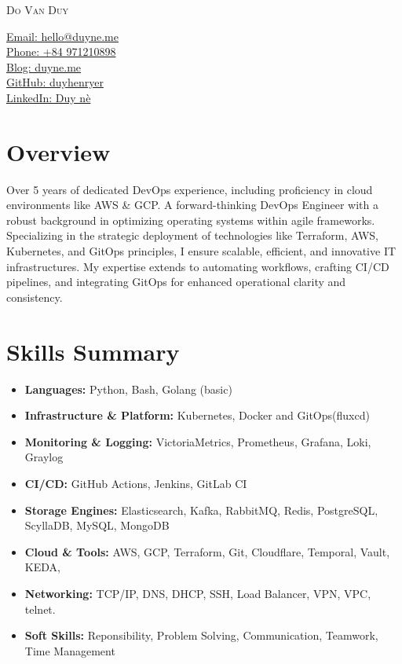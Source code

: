 \documentclass[11pt, a4paper]{article}
\begin{document}
\noindent
\begin{minipage}[t]{0.60\textwidth}
    \Huge\scshape Do Van Duy
\end{minipage}%
\begin{minipage}[t]{0.40\textwidth}
    \raggedleft
    \normalsize
    \href{mailto:hello@duyne.me}{Email: hello@duyne.me}\\
    \href{tel:+84971210898}{Phone: +84 971210898}\\
    \href{https://duyne.me}{Blog: duyne.me}\\
    \href{https://github.com/duyhenryerz}{GitHub: duyhenryer}\\
    \href{https://linkedin.com/in/duyne}{LinkedIn: Duy nè}
\end{minipage}
\vspace{0.75em}


\section{Overview}
\begingroup
{}
Over 5 years of dedicated DevOps experience, including proficiency in cloud environments like AWS \& GCP. A forward-thinking DevOps Engineer with a robust background in optimizing operating systems within agile frameworks. Specializing in the strategic deployment of technologies like Terraform, AWS, Kubernetes, and GitOps principles, I ensure scalable, efficient, and innovative IT infrastructures. My expertise extends to automating workflows, crafting CI/CD pipelines, and integrating GitOps for enhanced operational clarity and consistency.
\endgroup

\section{Skills Summary}
\begin{itemize}[leftmargin=*, label={}]
    \item \textbf{Languages:} Python, Bash, Golang (basic)
    \item \textbf{Infrastructure \& Platform:} Kubernetes, Docker and GitOps(fluxcd)
    \item \textbf{Monitoring \& Logging:} VictoriaMetrics, Prometheus, Grafana, Loki, Graylog
    \item \textbf{CI/CD:} GitHub Actions, Jenkins, GitLab CI
    \item \textbf{Storage Engines:} Elasticsearch, Kafka, RabbitMQ, Redis, PostgreSQL, ScyllaDB, MySQL, MongoDB
    \item \textbf{Cloud \& Tools:} AWS, GCP, Terraform, Git, Cloudflare, Temporal, Vault, KEDA,
    \item \textbf{Networking:} TCP/IP, DNS, DHCP, SSH, Load Balancer, VPN, VPC, telnet.
    \item \textbf{Soft Skills:} Reponsibility, Problem Solving, Communication, Teamwork, Time Management    
\end{itemize}
\end{document}
